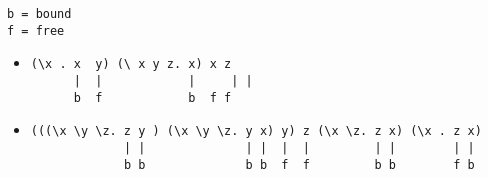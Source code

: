 \begin{verbatim}
b = bound
f = free
\end{verbatim}
\begin{itemize}
\item
\begin{verbatim}
(\x . x  y) (\ x y z. x) x z
      |  |            | 	| | 
      b  f            b  f f
\end{verbatim}        
\item
\begin{verbatim}
(((\x \y \z. z y ) (\x \y \z. y x) y) z (\x \z. z x) (\x . z x)
             | |              | |  |  |         | |        | |
             b b              b b  f  f         b b        f b
\end{verbatim}
\end{itemize}